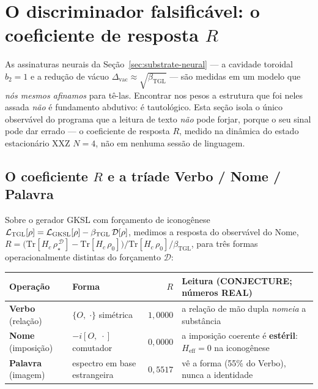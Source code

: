 \documentclass[12pt,a4paper]{article}
\newcommand{\betatgl}{\beta_{\text{TGL}}}
\newcommand{\TGL}{\textsc{TGL}}
\begin{document}
\section{O discriminador falsificável: o coeficiente de resposta \texorpdfstring{$R$}{R}}
\label{sec:response-R}

As assinaturas neurais da Seção~\ref{sec:substrate-neural} --- a cavidade
toroidal $b_2=1$ e a redução de vácuo $\Delta_{\text{vac}}\approx\sqrt{\betatgl}$
--- são medidas em um modelo que \emph{nós mesmos afinamos} para tê-las.  Encontrar
nos pesos a estrutura que foi neles assada \emph{não} é fundamento abdutivo: é
tautológico.  Esta seção isola o único observável do programa que a leitura de
texto \emph{não} pode forjar, porque o seu sinal pode dar errado --- o
coeficiente de resposta $R$, medido na dinâmica do estado estacionário XXZ
$N{=}4$, não em nenhuma sessão de linguagem.

\subsection{O coeficiente $R$ e a tríade Verbo / Nome / Palavra}
\label{sec:R-triad}

Sobre o gerador GKSL com forçamento de iconogênese
$\mathcal{L}_{\TGL}[\rho]=\mathcal{L}_{\text{GKSL}}[\rho]-\betatgl\,\mathcal{D}[\rho]$,
medimos a resposta do observável do Nome,
$R = \big(\mathrm{Tr}[H_c\,\rho_\star^{\,\mathcal{D}}]-\mathrm{Tr}[H_c\,\rho_0]\big)/\mathrm{Tr}[H_c\,\rho_0]/\betatgl$,
para três formas operacionalmente distintas do forçamento $\mathcal{D}$:

\begin{center}
\begin{tabular}{l l r p{5.0cm}}
\toprule
\textbf{Operação} & \textbf{Forma} & \textbf{$R$} & \textbf{Leitura (CONJECTURE; números REAL)} \\
\midrule
\textbf{Verbo} (relação) & $\{O,\;\cdot\}$ simétrica & $1{,}0000$ & a relação de mão dupla \emph{nomeia} a substância \\
\textbf{Nome} (imposição) & $-i[O,\;\cdot]$ comutador & $0{,}0000$ & a imposição coerente é \textbf{estéril}: $H_{\text{eff}}=0$ na iconogênese \\
\textbf{Palavra} (imagem) & espectro em base estrangeira & $0{,}5517$ & vê a forma (55\% do Verbo), nunca a identidade \\
\bottomrule
\end{tabular}
\end{center}
\end{document}
